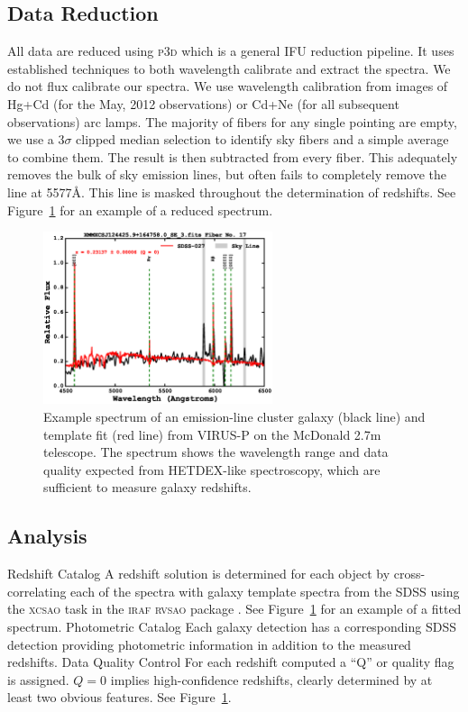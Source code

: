 \documentclass[12pt]{article}
\begin{document}
\subsection{Data Reduction}
\begin{outline}[enumerate]
	\1 All data are reduced using \textsc{p3d} \citep{Sandin2010} which is a general IFU reduction pipeline. It uses established techniques to both wavelength calibrate and extract the spectra. We do not flux calibrate our spectra.
	\1 We use wavelength calibration from images of Hg+Cd (for the May, 2012 observations) or Cd+Ne (for all subsequent observations) arc lamps.
	\1 The majority of fibers for any single pointing are empty, we use a $3\sigma$ clipped median selection to identify sky fibers and a simple average to combine them. The result is then subtracted from every fiber. This adequately removes the bulk of sky emission lines, but often fails to completely remove the  line at 5577\AA. This line is masked throughout the determination of redshifts. See Figure~\ref{fig:spectrum} for an example of a reduced spectrum.
		\begin{figure} 
			\includegraphics[width=0.6\textwidth]{./figures/spectrum.eps} 
			\caption{Example spectrum of an emission-line cluster galaxy (black line) and template fit (red line) from VIRUS-P on the McDonald 2.7m telescope. The spectrum shows the wavelength range and data quality expected from HETDEX-like spectroscopy, which are sufficient to measure galaxy redshifts.}
			\label{fig:spectrum} 
		\end{figure}
\end{outline}

\subsection{Analysis}
\begin{outline}[enumerate]
	\1 Redshift Catalog
		\2 A redshift solution is determined for each object by cross-correlating \citep{Tonry1979} each of the spectra with galaxy template spectra from the SDSS using the \textsc{xcsao} task in the \textsc{iraf} \textsc{rvsao} package \citep{Kurtz1992}. See Figure~\ref{fig:spectrum} for an example of a fitted spectrum.
	\1 Photometric Catalog
		\2 Each galaxy detection has a corresponding SDSS detection providing photometric information in addition to the measured redshifts. 
	\1 Data Quality Control
		\2 For each redshift computed a ``Q'' or quality flag is assigned. $Q=0$ implies high-confidence redshifts, clearly determined by at least two obvious features. See Figure~\ref{fig:spectrum}.
\end{outline}
\end{document}
